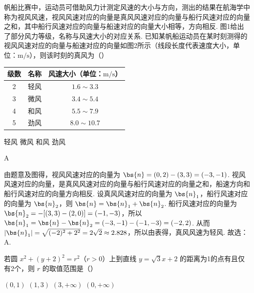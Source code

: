 \begin{problem}

帆船比赛中，运动员可借助风力计测定风速的大小与方向，测出的结果在航海学中称为视风风速，视风风速对应的向量是真风风速对应的向量与船行风速对应的向量之和，其中船行风速对应的向量与船速对应的向量大小相等，方向相反.
图1给出了部分风力等级，名称与风速大小的对应关系.
已知某帆船运动员在某时刻测得的视风风速对应的向量与船速对应的向量如图2所示（线段长度代表速度大小，单位：\(\mathrm{m/s}\)），则该时刻的真风为（\quad）

\begin{center}
\begin{tabular}{|c|c|c|}
\hline
级数 & 名称 & 风速大小（单位：\(\mathrm{m/s}\)） \\
\hline
2 & 轻风 & \(1.6\sim3.3\) \\
\hline
3 & 微风 & \(3.4\sim5.4\) \\
\hline
4 & 和风 & \(5.5\sim7.9\) \\
\hline
5 & 劲风 & \(8.0\sim10.7\) \\
\hline
\end{tabular}
\end{center}


\choices
    {轻风}
    {微风}
    {和风}
    {劲风}
\end{problem}

\begin{answer}
A
\end{answer}

\begin{solution}
由题意及图得，视风风速对应的向量为 \(\bs{n}=(0,2)-(3,3)=(-3,-1)\). 视风风速对应的向量，是真风风速对应的向量与船行风速对应的向量之和，船速方向和船行风速对应的向量方向相反. 设真风风速对应的向量为 \(\bs{n}_1\)，船行风速对应的向量为 \(\bs{n}_2\)，则 \(\bs{n} = \bs{n}_1 + \bs{n}_2\). 船行风速对应的向量为 \(\bs{n}_2=-[(3,3)-(2,0)]=(-1,-3)\)，所以 \(\bs{n}_1=\bs{n}-\bs{n}_2=(-3,-1)-(-1,-3)=(-2,2)\). 从而 \(|\bs{n}_1|=\sqrt{(-2)^2+2^2}=2\sqrt{2}\approx 2.828\)，所以由表得，真风风速为轻风. 故选：A.
\end{solution}

\begin{problem}
若圆 \(x^2 + (y+2)^2 = r^2\)（\(r>0\)）上到直线 \(y = \sqrt{3}x + 2\) 的距离为1的点有且仅有2个，则 \(r\) 的取值范围是（\quad）

\choices
    {\((0,1)\)}
    {\((1,3)\)}
    {\((3,+\infty)\)}
    {\((0,+\infty)\)}
\end{problem}

